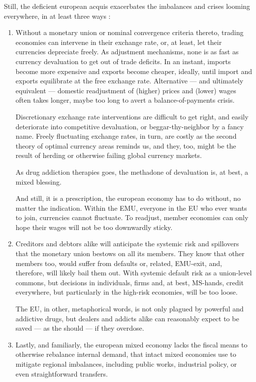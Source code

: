 \documentclass[11pt,a4paper,oneside,openright]{article}
\begin{document}
Still, the deficient european acquis exacerbates the imbalances and crises looming everywhere, in at least three ways \citep[echoed by][25]{Bordo2011}:
\begin{enumerate}
	\item Without a monetary union or nominal convergence criteria thereto, trading economies can intervene in their exchange rate, or, at least, let their currencies depreciate freely. 
	As adjustment mechanisms, none is as fast as currency devaluation to get out of trade deficits. 
	In an instant, imports become more expensive and exports become cheaper, ideally, until import and exports equilibrate at the free exchange rate. 
	Alternative --- and ultimately equivalent --- domestic readjustment of (higher) prices and (lower) wages often takes longer, maybe too long to avert a \gls{balance-of-payments} crisis. 
	
	Discretionary exchange rate interventions are difficult to get right, and easily deteriorate into competitive devaluation, or beggar-thy-neighbor by a fancy name. %
	Freely fluctuating exchange rates, in turn, are costly as the second theory of optimal currency areas reminds us, %
	and they, too, might be the result of herding or otherwise failing global currency markets.
	
	As drug addiction therapies goes, the methadone of devaluation is, at best, a mixed blessing.
	
	And still, it is a prescription, the european economy has to do without, no matter the indication. 
	Within the \gls{EMU}, everyone in the \gls{EU} who ever wants to join, currencies cannot fluctuate. 
	To readjust, member economies can only hope their wages will not be too downwardly sticky.
	
	\item Creditors and debtors alike will anticipate the systemic risk and spillovers that the monetary union bestows on all its members. 
	They know that other members too, would suffer from defaults or, related, \gls{EMU}-exit, and, therefore, will likely bail them out. 
	With systemic default risk as a union-level commons, but decisions in individuals, firms and, at best, \gls{MS}-hands, credit everywhere, but particularly in the high-risk economies, will be too loose.
	
	The \gls{EU}, in other, metaphorical words, is not only plagued by powerful and addictive drugs, but dealers and addicts alike can reasonably expect to be saved --- as the should --- if they overdose.
	
	\item Lastly, and familiarly, the european mixed economy lacks the fiscal means to otherwise rebalance internal demand, that intact mixed economies use to mitigate regional imbalances, including public works, industrial policy, or even straightforward transfers.
\end{enumerate}
\end{document}

